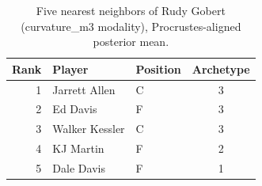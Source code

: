 \begin{table}[htbp]
  \centering\small
  \begin{tabular}{rllc}
    \toprule
    Rank & Player & Position & Archetype \\
    \midrule
    1 & Jarrett Allen & C & 3 \\
    2 & Ed Davis & F & 3 \\
    3 & Walker Kessler & C & 3 \\
    4 & KJ Martin & F & 2 \\
    5 & Dale Davis & F & 1 \\
    \bottomrule
  \end{tabular}
  \caption{Five nearest neighbors of Rudy Gobert (curvature_m3 modality), Procrustes-aligned posterior mean.}
  \label{tab:Rudy_Gobert_neighbors_curvature_m3}
\end{table}

